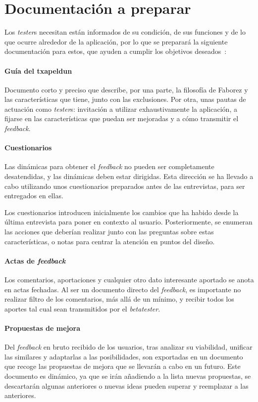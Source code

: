\documentclass[main]{subfiles}
\begin{document}
\section{Documentación a preparar}

Los \emph{tester}s necesitan están informados de su condición, de sus funciones y de lo que ocurre alrededor de la aplicación, por lo que se preparará la siguiente documentación para estos, que ayuden a cumplir los objetivos deseados~\autocite{mikelnino:entrevistas}:

\paragraph{Guía del \gls{txapeldun}}
Documento corto y preciso que describe, por una parte, la filosofía de Faborez y las características que tiene, junto con las exclusiones. Por otra, unas pautas de actuación como \emph{tester}s: invitación a utilizar exhaustivamente la aplicación, a fijarse en las características que puedan ser mejoradas y a cómo transmitir el \emph{feedback}.

\paragraph{Cuestionarios}
Las dinámicas para obtener el \emph{feedback} no pueden ser completamente desatendidas, y las dinámicas deben estar dirigidas. Esta dirección se ha llevado a cabo utilizando unos cuestionarios preparados antes de las entrevistas, para ser entregados en ellas.

Los cuestionarios introducen inicialmente los cambios que ha habido desde la última entrevista para poner en contexto al usuario. Posteriormente, se enumeran las acciones que deberían realizar junto con las preguntas sobre estas características, o notas para centrar la atención en puntos del diseño.

\paragraph{Actas de \emph{feedback}}
Los comentarios, aportaciones y cualquier otro dato interesante aportado se anota en actas fechadas. Al ser un documento directo del \emph{feedback}, es importante no realizar filtro de los comentarios, más allá de un mínimo, y recibir todos los aportes tal cual sean transmitidos por el \emph{betatester}.

\paragraph{Propuestas de mejora}
Del \emph{feedback} en bruto recibido de los usuarios, tras analizar su viabilidad, unificar las similares y adaptarlas a las posibilidades, son exportadas en un documento que recoge las propuestas de mejora que se llevarán a cabo en un futuro. Este documento es dinámico, ya que se irán añadiendo a la lista nuevas propuestas, se descartarán algunas anteriores o nuevas ideas pueden superar y reemplazar a las anteriores.
\end{document}
